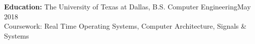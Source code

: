 \textbf{Education:} The University of Texas at Dallas, B.S. Computer Engineering\hfill May 2018
\hfill
\\
Coursework: Real Time Operating Systems, Computer Architecture, Signals \& Systems

